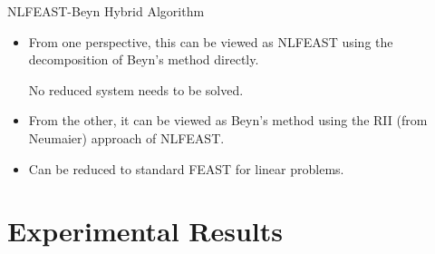 \documentclass[mathserif, xcolor=table]{beamer}
\begin{document}
\begin{frame}{NLFEAST-Beyn Hybrid Algorithm}
	\begin{itemize}
		\item From one perspective, this can be viewed as NLFEAST using the decomposition of Beyn's method directly.

			No reduced system needs to be solved.

			\vspace{2em}
		\item From the other, it can be viewed as Beyn's method using the RII (from Neumaier) approach of NLFEAST.\@
			\vspace{2em}
		\item Can be reduced to standard FEAST for linear problems.
			\vspace{2em}
	\end{itemize}
\end{frame}



\section{Experimental Results}
\end{document}
